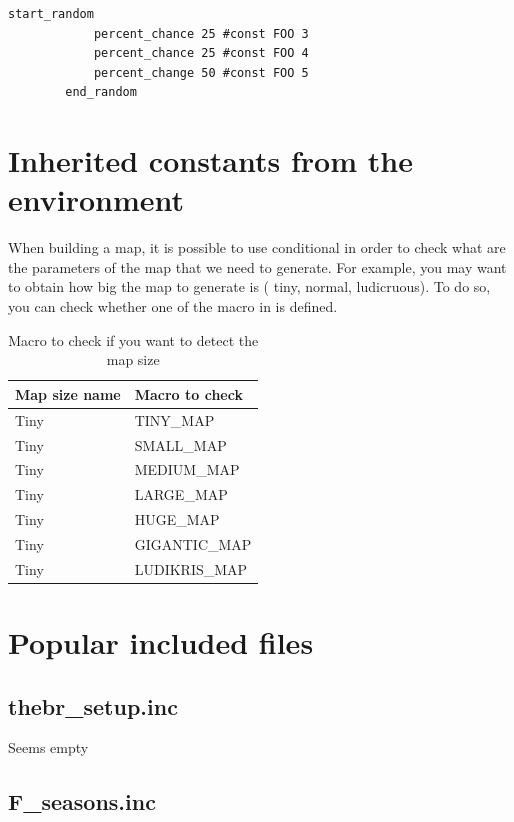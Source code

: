     \begin{lstlisting}[language=rms,label=rms:startrandom]
        start_random
            percent_chance 25 #const FOO 3
            percent_chance 25 #const FOO 4
            percent_change 50 #const FOO 5
        end_random
    \end{lstlisting}

    \section{Inherited constants from the environment}

    When building a map, it is possible to use conditional in order to check what are the parameters of the map that we need to generate. For example, you may want to obtain how big the map to generate is (\eg{} tiny, normal, ludicruous). To do so, you can check whether one of the macro in  is defined.

    \begin{table}
        \centering
        \begin{tabular}{ll}
            \toprule
            Map size name & Macro to check \\
            \midrule
            Tiny & TINY\_MAP \\
            Tiny & SMALL\_MAP \\
            Tiny & MEDIUM\_MAP \\
            Tiny & LARGE\_MAP \\
            Tiny & HUGE\_MAP \\
            Tiny & GIGANTIC\_MAP \\
            Tiny & LUDIKRIS\_MAP \\
            \bottomrule
        \end{tabular}
        \caption{Macro to check if you want to detect the map size}
        \label{tbl:mapsizemacro}
    \end{table}

    \section{Popular included files}

    \subsection{thebr\_setup.inc}

    Seems empty

    \subsection{F\_seasons.inc}

